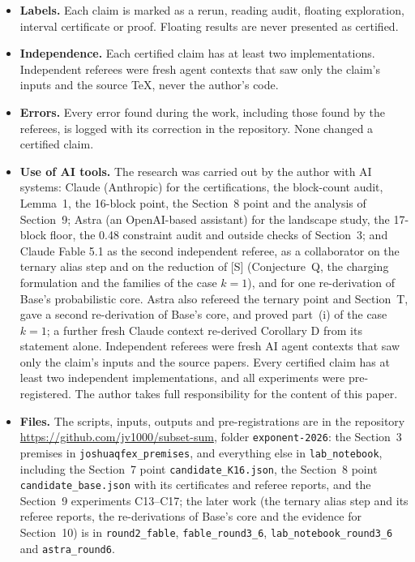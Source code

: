 \documentclass[11pt]{article}
\theoremstyle{plain}
\begin{document}
\begin{itemize}
\item \textbf{Labels.} Each claim is marked as a rerun, reading audit, floating exploration, interval certificate or proof. Floating results are never presented as certified.
\item \textbf{Independence.} Each certified claim has at least two implementations. Independent referees were fresh agent contexts that saw only the claim's inputs and the source TeX, never the author's code.
\item \textbf{Errors.} Every error found during the work, including those found by the referees, is logged with its correction in the repository. None changed a certified claim.
\item \textbf{Use of AI tools.} The research was carried out by the author with AI systems: Claude (Anthropic) for the certifications, the block-count audit, Lemma~1, the 16-block point, the Section~8 point and the analysis of Section~9; Astra (an OpenAI-based assistant) for the landscape study, the 17-block floor, the 0.48 constraint audit and outside checks of Section~3; and Claude Fable 5.1 as the second independent referee, as a collaborator on the ternary alias step and on the reduction of [S] (Conjecture~Q, the charging formulation and the families of the case $k = 1$), and for one re-derivation of Base's probabilistic core. Astra also refereed the ternary point and Section~T, gave a second re-derivation of Base's core, and proved part~(i) of the case $k = 1$; a further fresh Claude context re-derived Corollary D from its statement alone. Independent referees were fresh AI agent contexts that saw only the claim's inputs and the source papers. Every certified claim has at least two independent implementations, and all experiments were pre-registered. The author takes full responsibility for the content of this paper.
\item \textbf{Files.} The scripts, inputs, outputs and pre-registrations are in the repository \url{https://github.com/jv1000/subset-sum}, folder \texttt{exponent-2026}: the Section~3 premises in \texttt{joshuaqfex\_premises}, and everything else in \texttt{lab\_notebook}, including the Section~7 point \texttt{candidate\_K16.json}, the Section~8 point \texttt{candidate\_base.json} with its certificates and referee reports, and the Section~9 experiments C13--C17; the later work (the ternary alias step and its referee reports, the re-derivations of Base's core and the evidence for Section~10) is in \texttt{round2\_fable}, \texttt{fable\_round3\_6}, \texttt{lab\_notebook\_round3\_6} and \texttt{astra\_round6}.
\end{itemize}
\end{document}
